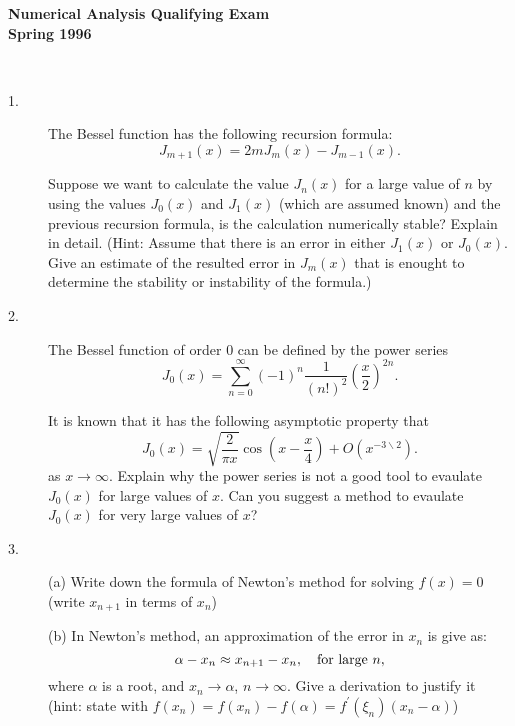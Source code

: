\documentclass{article}
\begin{document}






\begin{center}\begin{LARGE}
{\bf Numerical Analysis Qualifying Exam}\\ 
{\bf Spring 1996}\\ \end{LARGE}
\end{center}
\vspace{0.1in}
\noindent\hrulefill\\
\begin{description}

\item[1.]
The Bessel function has the following recursion formula:
$$J_{m+1} (x) = 2mJ_m(x) - J_{m-1}(x).$$

Suppose we want to calculate the value $J_n(x)$ for a large value of $n$ by
using the values $J_0(x)$ and $J_1(x)$ (which are assumed known) and the
previous recursion formula, is the calculation numerically stable? Explain
in detail. (Hint: Assume that there is an error in either $J_1(x)$ or
$J_0(x)$. Give an estimate of the resulted error in $J_m(x)$ that is enought
to determine the stability or instability of the formula.)

\item[2.]
The Bessel function of order 0 can be defined by the power series
$$J_0(x) = \sum^\infty_{n=0} (-1)^n \frac{1}{(n!)^2}
  \left( \frac{x}{2} \right)^{2n}.$$

It is known that it has the following asymptotic property that
$$J_0(x) = \sqrt{\frac{2}{\pi x}} \cos \left(x-\frac{x}{4} \right) +
  O(x^{-3 \backslash 2}).$$
as $x \to \infty$. Explain why the power series is not a good tool to
evaulate $J_0(x)$ for large values of $x$. Can you suggest a method to
evaulate $J_0(x)$ for very large values of $x$?

\item[3.] (a)
Write down the formula of Newton's method for solving $f(x)=0$ (write
$x_{n+1}$ in terms of $x_n$)

\item[\quad] (b)
In Newton's method, an approximation of the error in $x_n$ is give as:
$$\alpha - x_n \approx x_{n+1} - x_n, \quad \hbox{for} \hbox{\ large\ } n,$$
where $\alpha$ is a root, and $x_n \to \alpha$, $n \to \infty$. Give
a derivation to justify it (hint: state with
$f(x_n)=f(x_n) - f(\alpha) = f^\prime(\xi_n) (x_n- \alpha)$)


\end{description}
\end{document}
